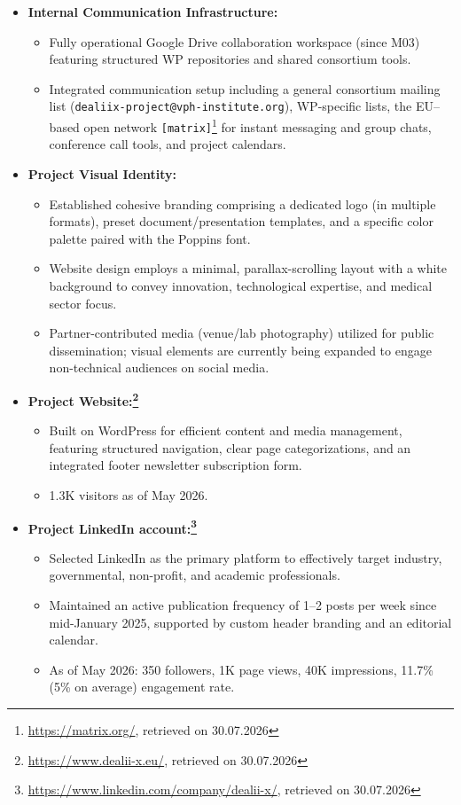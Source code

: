 \documentclass[a4paper,12pt, numbers]{article}
\begin{document}
\begin{itemize}
\item \textbf{Internal Communication Infrastructure:}
\begin{itemize}[left=1em, itemsep=0pt, topsep=0pt]
\item Fully operational Google Drive collaboration workspace (since M03) featuring structured WP repositories and shared consortium tools.
\item Integrated communication setup including a general consortium mailing list (\texttt{dealiix-project@vph-institute.org}), WP-specific lists, the EU--based open network \texttt{[matrix]}\footnote{\url{https://matrix.org/}, retrieved on 30.07.2026} for instant messaging and group chats, conference call tools, and project calendars.
\end{itemize}

\item \textbf{Project Visual Identity:}
\begin{itemize}[left=1em, itemsep=0pt, topsep=0pt]
\item Established cohesive branding comprising a dedicated logo (in multiple formats), preset document/presentation templates, and a specific color palette paired with the Poppins font.
\item Website design employs a minimal, parallax-scrolling layout with a white background to convey innovation, technological expertise, and medical sector focus.
\item Partner-contributed media (venue/lab photography) utilized for public dissemination; visual elements are currently being expanded to engage non-technical audiences on social media.
\end{itemize}

\item \textbf{Project Website:\footnote{\url{https://www.dealii-x.eu/}, retrieved on 30.07.2026}}
\begin{itemize}[left=1em, itemsep=0pt, topsep=0pt]
\item Built on WordPress for efficient content and media management, featuring structured navigation, clear page categorizations, and an integrated footer newsletter subscription form.
\item 1.3K visitors as of May 2026.
\end{itemize}

\item \textbf{Project LinkedIn account:\footnote{\url{https://www.linkedin.com/company/dealii-x/}, retrieved on 30.07.2026}}
\begin{itemize}[left=1em, itemsep=0pt, topsep=0pt]
\item Selected LinkedIn as the primary platform  to effectively target industry, governmental, non-profit, and academic professionals.
\item Maintained an active publication frequency of 1--2 posts per week since mid-January 2025, supported by custom header branding and an editorial calendar.
\item As of May 2026: 350 followers, 1K page views, 40K impressions, 11.7\% (5\% on average) engagement rate.
\end{itemize}


\end{itemize}
\end{document}
